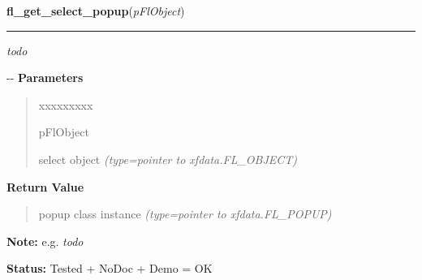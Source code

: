\hspace{.8\funcindent}\begin{boxedminipage}{\funcwidth}

    \raggedright \textbf{fl\_get\_select\_popup}(\textit{pFlObject})

    \vspace{-1.5ex}

    \rule{\textwidth}{0.5\fboxrule}
\setlength{\parskip}{2ex}

\emph{todo}

-{}-
\setlength{\parskip}{1ex}
      \textbf{Parameters}
      \vspace{-1ex}

      \begin{quote}
        \begin{Ventry}{xxxxxxxxx}

          \item[pFlObject]


select object
            {\it (type=pointer to xfdata.FL\_OBJECT)}

        \end{Ventry}

      \end{quote}

      \textbf{Return Value}
    \vspace{-1ex}

      \begin{quote}

popup class instance
      {\it (type=pointer to xfdata.FL\_POPUP)}

      \end{quote}

\textbf{Note:} 
e.g. \emph{todo}


\textbf{Status:} 
Tested + NoDoc + Demo = OK


    \end{boxedminipage}

    \label{xformslib:flselect:fl_set_select_popup}

    \vspace{0.5ex}

